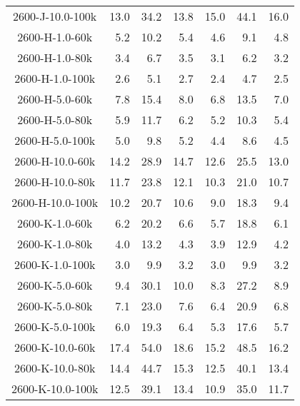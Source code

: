 \begin{longtable}{crrrrrr}
      2600-J-10.0-100k &  13.0 &  34.2 &  13.8 &  15.0 &  44.1 &  16.0 \\
      2600-H-1.0-60k   &   5.2 &  10.2 &   5.4 &   4.6 &   9.1 &   4.8 \\
      2600-H-1.0-80k   &   3.4 &   6.7 &   3.5 &   3.1 &   6.2 &   3.2 \\
      2600-H-1.0-100k  &   2.6 &   5.1 &   2.7 &   2.4 &   4.7 &   2.5 \\
      2600-H-5.0-60k   &   7.8 &  15.4 &   8.0 &   6.8 &  13.5 &   7.0 \\
      2600-H-5.0-80k   &   5.9 &  11.7 &   6.2 &   5.2 &  10.3 &   5.4 \\
      2600-H-5.0-100k  &   5.0 &   9.8 &   5.2 &   4.4 &   8.6 &   4.5 \\
      2600-H-10.0-60k  &  14.2 &  28.9 &  14.7 &  12.6 &  25.5 &  13.0 \\
      2600-H-10.0-80k  &  11.7 &  23.8 &  12.1 &  10.3 &  21.0 &  10.7 \\
      2600-H-10.0-100k &  10.2 &  20.7 &  10.6 &   9.0 &  18.3 &   9.4 \\
      2600-K-1.0-60k   &   6.2 &  20.2 &   6.6 &   5.7 &  18.8 &   6.1 \\
      2600-K-1.0-80k   &   4.0 &  13.2 &   4.3 &   3.9 &  12.9 &   4.2 \\
      2600-K-1.0-100k  &   3.0 &   9.9 &   3.2 &   3.0 &   9.9 &   3.2 \\
      2600-K-5.0-60k   &   9.4 &  30.1 &  10.0 &   8.3 &  27.2 &   8.9 \\
      2600-K-5.0-80k   &   7.1 &  23.0 &   7.6 &   6.4 &  20.9 &   6.8 \\
      2600-K-5.0-100k  &   6.0 &  19.3 &   6.4 &   5.3 &  17.6 &   5.7 \\
      2600-K-10.0-60k  &  17.4 &  54.0 &  18.6 &  15.2 &  48.5 &  16.2 \\
      2600-K-10.0-80k  &  14.4 &  44.7 &  15.3 &  12.5 &  40.1 &  13.4 \\
      2600-K-10.0-100k &  12.5 &  39.1 &  13.4 &  10.9 &  35.0 & 11.7
    \label{tab:rv_aces_btsettl}
\end{longtable}


\clearpage{}

